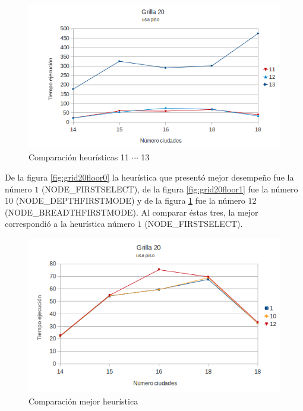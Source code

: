 \documentclass[10pt]{article}
\begin{document}
\begin{figure}[ht]
\begin{minipage}[b]{1\linewidth}
  \centering
 \includegraphics[scale=0.4]{grilla20floor2.png}
 \caption{Comparación heurísticas  11 $\cdots$ 13}
 \label{fig:grid20floor2}
\end{minipage}

\end{figure}


De la figura \ref{fig:grid20floor0} la heurística que presentó mejor desempeño fue la número $1$ (NODE\_FIRSTSELECT), de la figura \ref{fig:grid20floor1} fue la número $10$ (NODE\_DEPTHFIRSTMODE) y de la 
figura \ref{fig:grid20floor2} fue la número $12$ (NODE\_BREADTHFIRSTMODE). Al comparar éstas tres, la mejor correspondió a la heurística número $1$ (NODE\_FIRSTSELECT).


\begin{figure}[ht]
\begin{minipage}[b]{1\linewidth}

 \centering
 \includegraphics[scale=0.4]{grilla20floor3.png}
 \caption{Comparación mejor heurística}
 \label{fig:grid20floor3}
\end{minipage}
\end{figure}
\end{document}
